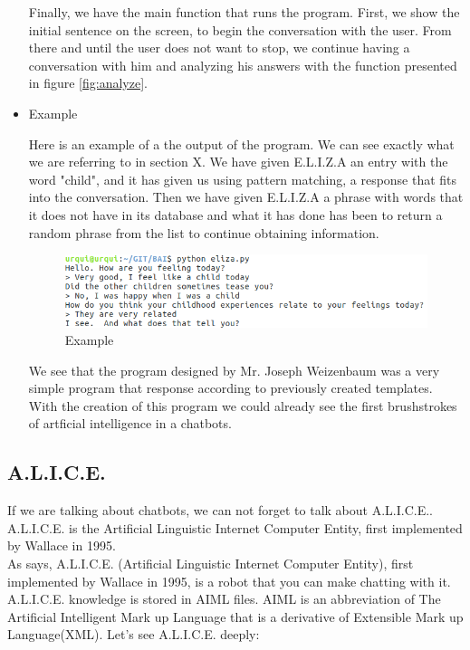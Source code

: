 \documentclass[12pt,twoside]{article}
\theoremstyle{plain}
\theoremstyle{definition}
\theoremstyle{remark}
\begin{document}
\begin{itemize}
\begin{figure}[h]
\end{figure}
Finally, we have the main function that runs the program. First, we show the initial sentence on the screen, to begin the conversation with the user. From there and until the user does not want to stop, we continue having a conversation with him and analyzing his answers with the function presented in figure \ref{fig:analyze}.\\


\item{Example}
	
Here is an example of a the output of the program. We can see exactly what we are referring to in section X. We have given E.L.I.Z.A an entry with the word "child", and it has given us using pattern matching, a response that fits into the conversation. Then we have given E.L.I.Z.A a phrase with words that it does not have in its database and what it has done has been to return a random phrase from the list to continue obtaining information.

\begin{figure}[h]
\centering
\includegraphics[scale=0.6]{./Pictures/example.png}
\caption{Example}
\end{figure}

We see that the program designed by Mr. Joseph Weizenbaum was a very simple program that response according to previously created templates. With the creation of this program we could already see the first brushstrokes of artficial intelligence in a chatbots.
 
\end{itemize}
\newpage		
\subsection{A.L.I.C.E.}
	\label{sec:alice}
	
	If we are talking about chatbots, we can not forget to talk about A.L.I.C.E.. A.L.I.C.E. is the Artificial Linguistic Internet Computer Entity, first implemented by Wallace in 1995. \\
	 As \cite{shawar2002comparison} says, A.L.I.C.E. (Artificial Linguistic Internet Computer Entity), first implemented by Wallace in 1995,  is a robot that you can make chatting with it. A.L.I.C.E. knowledge is stored in AIML files. AIML is an abbreviation of The Artificial Intelligent Mark up Language that is a derivative of Extensible Mark up Language(XML). Let's see A.L.I.C.E. deeply:
\end{document}
